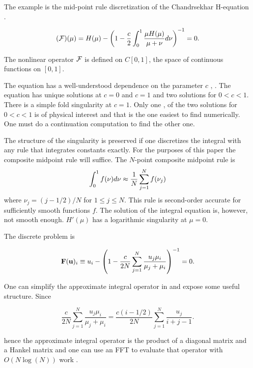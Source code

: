 \documentclass[11pt]{article}
\begin{document}
The example is the mid-point rule discretization of the Chandrsekhar
H-equation \cite{chand}.

\begin{equation}
    ({{\cal F}})(\mu) = H(\mu) -
\left(
1 - \frac{c}{2} \int_0^1 \frac{\mu H(\mu)}{\mu + \nu} d \nu
\right)^{-1} = 0.
    \end{equation}

The nonlinear operator \({\cal F}\) is defined on \(C[0,1]\), the space of
continuous functions on \([0,1]\).

The equation has a well-understood dependence on the parameter \(c\)
\cite{twm68}, \cite{ctk:n1}. The equation has unique solutions at
\(c=0\) and \(c=1\) and two solutions for \(0 < c < 1\). There is a
simple fold singularity \cite{herb} at \(c=1\). Only one \cite{chand},
\cite{busb} of the two solutions for \(0 < c < 1\) is of physical
interest and that is the one easiest to find numerically. One must do a
continuation computation to find the other one.

The structure of the singularity is preserved if one discretizes the
integral with any rule that integrates constants exactly. For the
purposes of this paper the composite midpoint rule will suffice. The
\(N\)-point composite midpoint rule is \begin{equation}
\int_0^1 f(\nu) d \nu \approx \frac{1}{N} \sum_{j=1}^N f(\nu_j)
\end{equation} where \(\nu_j = (j - 1/2)/N\) for \(1 \le j \le N\). This
rule is second-order accurate for sufficiently smooth functions \(f\).
The solution of the integral equation is, however, not smooth enough.
\(H'(\mu)\) has a logarithmic singularity at \(\mu=0\).

The discrete problem is

\begin{equation}
{\bf F}({\bf u})_i \equiv
u_i - \left(
1  - \frac{c}{2N} \sum_{j=1}^N \frac{u_j \mu_i}{\mu_j + \mu_i}
\right)^{-1}
=0.
\end{equation}

One can simplify the approximate integral operator in  and
expose some useful structure. Since

\begin{equation}
\frac{c}{2N} \sum_{j=1}^N \frac{u_j \mu_i}{\mu_j + \mu_i}
= \frac{c (i - 1/2) }{2N} \sum_{j=1}^N \frac{u_j}{i+j -1}.
\end{equation}

hence the approximate integral operator is the product of a diagonal
matrix and a Hankel matrix and one can use an FFT to evaluate that
operator with \(O(N \log(N))\) work \cite{golub}.
\end{document}
